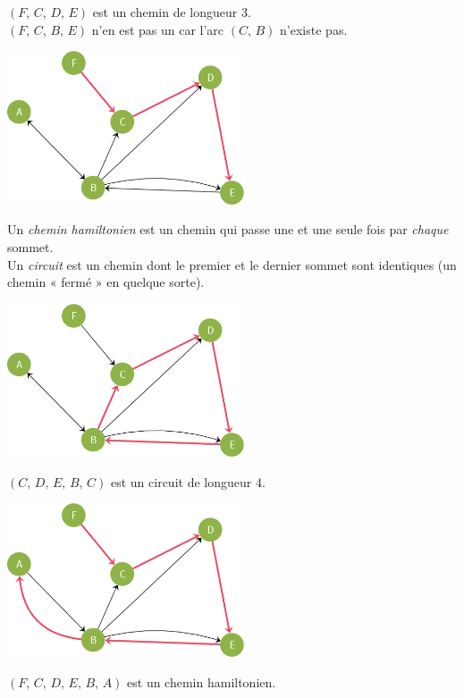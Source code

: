 \begin{exemple}[]
    $(F,\,C,\,D,\,E)$ est un chemin de longueur 3.\\
    $(F,\,C,\,B,\,E)$ n'en est pas un car l'arc $(C,\,B)$ n'existe pas.
    \begin{center}
        \includegraphics[width=7cm]{graphes/img/chemin.png}
    \end{center}
\end{exemple}

\begin{definition}
    
    Un \textit{chemin hamiltonien} est un chemin qui passe une et une seule fois par \textit{chaque} sommet.\\
    Un \textit{circuit} est un chemin dont le premier et le dernier sommet sont identiques (un chemin  «  fermé »  en quelque sorte).
\end{definition}


\begin{exemple}[s]
    
    \begin{center}
        \includegraphics[width=7cm]{graphes/img/circuit.png}
    \end{center}
    $(C,\,D,\,E,\,B,\,C)$ est un circuit de longueur 4.
    
    \begin{center}
        \includegraphics[width=7cm]{graphes/img/chemin_hamiltonien.png}
    \end{center}
    $(F,\,C,\,D,\,E,\,B,\,A)$ est un chemin hamiltonien.
    
\end{exemple}

